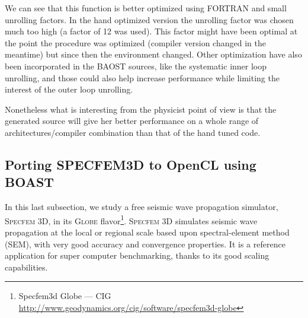 \documentclass[11pt, a4paper, twoside]{montblanc}
\newcommand{\productname}[1]{\textsc{#1}}
\newcommand{\Specfem}{\productname{Specfem 3D}\xspace}
\begin{document}
We can see that this function is better optimized using FORTRAN and small
unrolling factors. In the hand optimized version the unrolling factor was chosen
much too high (a factor of 12 was used). This factor might have been optimal at
the point the procedure was optimized (compiler version changed in the meantime) but
since then the environment changed. Other optimization have also been
incorporated in the BAOST sources, like the systematic inner loop unrolling, and
those could also help increase performance while limiting the interest of the
outer loop unrolling.

Nonetheless what is interesting from the physicist point of view is that the
generated source will give her better performance on a whole range of
architectures/compiler combination than that of the hand tuned code.

% 
% 
% 
% 
 


  \subsection{Porting SPECFEM3D to OpenCL using BOAST}
  \label{subsec:specfem}

In this last subsection, we study a free seismic wave propagation
simulator, \Specfem, in its \productname{Globe}
flavor\footnote{Specfem3d Globe --- CIG
  \url{http://www.geodynamics.org/cig/software/specfem3d-globe}}. \Specfem
simulates seismic wave propagation at the local or regional scale
based upon spectral-element method (SEM), with very good accuracy and
convergence properties. It is a reference application for super
computer benchmarking, thanks to its good scaling capabilities.
\end{document}
